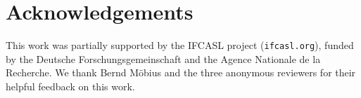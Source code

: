 \documentclass[a4paper]{article}
\begin{document}
  \section{Acknowledgements}
  {\color{blue}
  This work was partially supported by the IFCASL project (\texttt{ifcasl.org}), funded by the Deutsche Forschungsgemeinschaft and the Agence Nationale de la Recherche. We thank Bernd M\"{o}bius and the three anonymous reviewers for their helpful feedback on this work.
  }



  \eightpt
  

  

\end{document}
